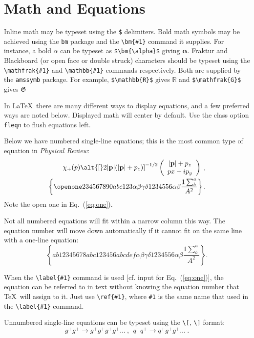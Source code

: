\documentclass[%
 reprint,
 amsmath,amssymb,
 aps,
]{revtex4-2}
\begin{document}
\section{Math and Equations}
Inline math may be typeset using the \verb+$+ delimiters. Bold math
symbols may be achieved using the \verb+bm+ package and the
\verb+\bm{#1}+ command it supplies. For instance, a bold $\alpha$ can
be typeset as \verb+$\bm{\alpha}$+ giving $\bm{\alpha}$. Fraktur and
Blackboard (or open face or double struck) characters should be
typeset using the \verb+\mathfrak{#1}+ and \verb+\mathbb{#1}+ commands
respectively. Both are supplied by the \texttt{amssymb} package. For
example, \verb+$\mathbb{R}$+ gives $\mathbb{R}$ and
\verb+$\mathfrak{G}$+ gives $\mathfrak{G}$

In \LaTeX\ there are many different ways to display equations, and a
few preferred ways are noted below. Displayed math will center by
default. Use the class option \verb+fleqn+ to flush equations left.

Below we have numbered single-line equations; this is the most common
type of equation in \textit{Physical Review}:
\begin{eqnarray}
\chi_+(p)\alt{\bf [}2|{\bf p}|(|{\bf p}|+p_z){\bf ]}^{-1/2}
\left(
\begin{array}{c}
|{\bf p}|+p_z\\
px+ip_y
\end{array}\right)\;,
\\
\left\{%
 \openone234567890abc123\alpha\beta\gamma\delta1234556\alpha\beta
 \frac{1\sum^{a}_{b}}{A^2}%
\right\}%
\label{eq:one}.
\end{eqnarray}
Note the open one in Eq.~(\ref{eq:one}).

Not all numbered equations will fit within a narrow column this
way. The equation number will move down automatically if it cannot fit
on the same line with a one-line equation:
\begin{equation}
\left\{
 ab12345678abc123456abcdef\alpha\beta\gamma\delta1234556\alpha\beta
 \frac{1\sum^{a}_{b}}{A^2}%
\right\}.
\end{equation}

When the \verb+\label{#1}+ command is used [cf. input for
Eq.~(\ref{eq:one})], the equation can be referred to in text without
knowing the equation number that \TeX\ will assign to it. Just
use \verb+\ref{#1}+, where \verb+#1+ is the same name that used in
the \verb+\label{#1}+ command.

Unnumbered single-line equations can be typeset
using the \verb+\[+, \verb+\]+ format:
\[g^+g^+ \rightarrow g^+g^+g^+g^+ \dots ~,~~q^+q^+\rightarrow
q^+g^+g^+ \dots ~. \]
\end{document}
